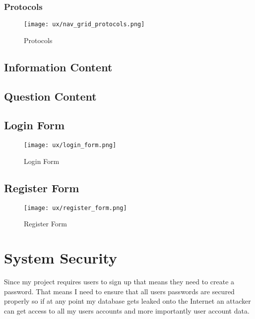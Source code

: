 \subsubsection{Protocols}
\begin{figure}[H]
\begin{center}
\texttt{[image: ux/nav\_grid\_protocols.png]}
\end{center} 
\caption{Protocols}
\label{ux_protocol}
\end{figure}

\subsection{Information Content}

\subsection{Question Content}

\subsection{Login Form}

\begin{figure}[H]
\begin{center}
\texttt{[image: ux/login\_form.png]}
\end{center}
\hspace{-2cm} 
\caption{Login Form}
\label{ux_login_form}
\end{figure}


\subsection{Register Form}

\begin{figure}[H]
\hspace{-2cm}
\begin{center}
\texttt{[image: ux/register\_form.png]}
\end{center} 
\caption{Register Form}
\label{ux_register_form}
\end{figure}


\section{System Security}

Since my project requires users to sign up that means they need to create a password. That means I need to ensure that all users passwords are secured properly so if at any point my database gets leaked onto the Internet an attacker can get access to all my users accounts and more importantly user account data. 

